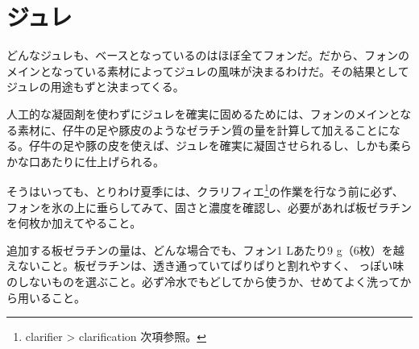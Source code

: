 \href{未、原文対照チェック}{} \href{未、日本語表現校正}{}
\href{未、その他修正}{} \href{未、原稿最終校正}{}

\hypertarget{gelees-diverses}{%
\section{ジュレ}\label{gelees-diverses}}


 

どんなジュレも、ベースとなっているのはほぼ全てフォンだ。だから、フォンのメインとなっている素材によってジュレの風味が決まるわけだ。その結果としてジュレの用途もずと決まってくる。

人工的な凝固剤を使わずにジュレを確実に固めるためには、フォンのメインとなる素材に、仔牛の足や豚皮のようなゼラチン質の量を計算して加えることになる。仔牛の足や豚の皮を使えば、ジュレを確実に凝固させられるし、しかも柔らかな口あたりに仕上げられる。

そうはいっても、とりわけ夏季には、クラリフィエ\footnote{clarifier
  \textgreater{} clarification 次項参照。}の作業を行なう前に必ず、フォンを氷の上に垂らしてみて、固さと濃度を確認し、必要があれば板ゼラチンを何枚か加えてやること。

追加する板ゼラチンの量は、どんな場合でも、フォン1 Lあたり9
g（6枚）を越えないこと。板ゼラチンは、透き通っていてぱりぱりと割れやすく、
っぽい味のしないものを選ぶこと。必ず冷水でもどしてから使うか、せめてよく洗ってから用いること。

